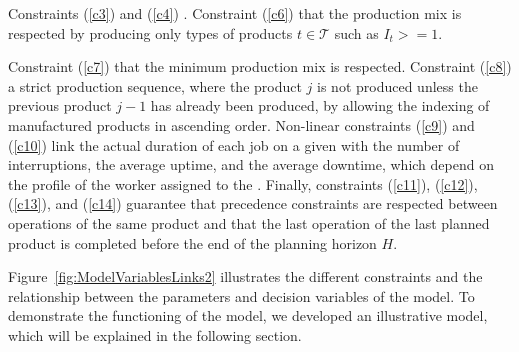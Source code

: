 \documentclass[review,12pt, 3p, times]{elsarticle}
\begin{document}
Constraints (\ref{c3}) and (\ref{c4})  . 
Constraint (\ref{c6})  that the production mix is respected by producing only types of products $t\in\mathcal{T}$ such as $I_t >= 1$.

Constraint  (\ref{c7})  that the minimum production mix is respected.
Constraint  (\ref{c8})  a strict production sequence, where the product $j$ is not produced unless the previous product $j-1$ has already been produced, by allowing the indexing of manufactured products in ascending order.
Non-linear constraints (\ref{c9}) and (\ref{c10}) link the actual duration of each job on a given  with the number of interruptions, the average uptime, and the average downtime,{\color{red}} which depend on the profile of the worker assigned to the .  
Finally, constraints (\ref{c11}), (\ref{c12}), (\ref{c13}), and (\ref{c14}) guarantee that precedence constraints are respected between operations of the same product and that the last operation of the last planned product is completed before the end of the planning horizon $H$.
	
Figure~\ref{fig:ModelVariablesLinks2} illustrates the different constraints and the relationship between the parameters and decision variables of the model. To demonstrate the functioning of the model, we developed an illustrative model, which will be explained in the following section.
	
\end{document}
